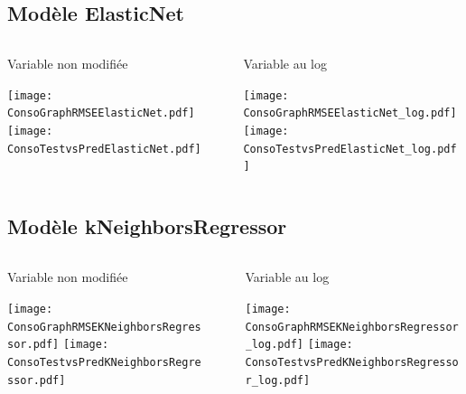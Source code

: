 \documentclass[8pt,aspectratio=169,hyperref={unicode=true}]{beamer}
\begin{document}
\subsection{Modèle ElasticNet}
\begin{frame}[t]{\insertsubsection}
  \begin{columns}
    \begin{column}{.33\textwidth}
      {\centering Variable non modifiée

      }
      \texttt{[image: ConsoGraphRMSEElasticNet.pdf]}
      \texttt{[image: ConsoTestvsPredElasticNet.pdf]}
    \end{column}
    \begin{column}{.33\textwidth}

    \end{column}
    \begin{column}{.33\textwidth}
      {\centering Variable au log

      }
      \texttt{[image: ConsoGraphRMSEElasticNet\_log.pdf]}
      \texttt{[image: ConsoTestvsPredElasticNet\_log.pdf]}
    \end{column}
  \end{columns}
\end{frame}

\subsection{Modèle kNeighborsRegressor}
\begin{frame}[t]{\insertsubsection}
  \begin{columns}
    \begin{column}{.33\textwidth}
      {\centering Variable non modifiée

      }
      \texttt{[image: ConsoGraphRMSEKNeighborsRegressor.pdf]}
      \texttt{[image: ConsoTestvsPredKNeighborsRegressor.pdf]}
    \end{column}
    \begin{column}{.33\textwidth}

    \end{column}
    \begin{column}{.33\textwidth}
      {\centering Variable au log

      }
      \texttt{[image: ConsoGraphRMSEKNeighborsRegressor\_log.pdf]}
      \texttt{[image: ConsoTestvsPredKNeighborsRegressor\_log.pdf]}
    \end{column}
  \end{columns}
\end{frame}
\end{document}
